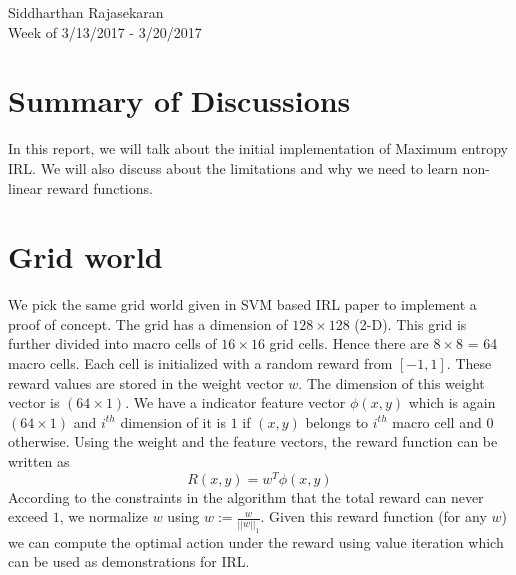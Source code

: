 \documentclass{article}[11pt]
\begin{document}
\begin{center}
Siddharthan Rajasekaran\\
Week of 3/13/2017 - 3/20/2017
\end{center}

\section{Summary of Discussions}
In this report, we will talk about the initial implementation of Maximum entropy IRL. We will also discuss about the limitations and why we need to learn non-linear reward functions. 

\section{Grid world}
We pick the same grid world given in SVM based IRL paper to implement a proof of concept. The grid has a dimension of $128 \times 128$ (2-D). This grid is further divided into macro cells of $16 \times 16$ grid cells. Hence there are $8\times8$ = 64 macro cells. Each cell is initialized with a random reward from $[-1,1]$. These reward values are stored in the weight vector $w$. The dimension of this weight vector is $(64\times 1)$. We have a indicator feature vector $\phi(x,y)$ which is again $(64\times 1)$ and $i^{th}$ dimension of it is $1$ if $(x,y)$ belongs to $i^{th}$ macro cell and $0$ otherwise. Using the weight and the feature vectors, the reward function can be written as $$R(x,y) = w^T\phi(x,y)$$ According to the constraints in the algorithm that the total reward can never exceed $1$, we normalize $w$ using $w := \frac{w}{||w||_1}$. Given this reward function (for any $w$) we can compute the optimal action under the reward using value iteration \cite{russell1995modern} which can be used as demonstrations for IRL.
\end{document}
